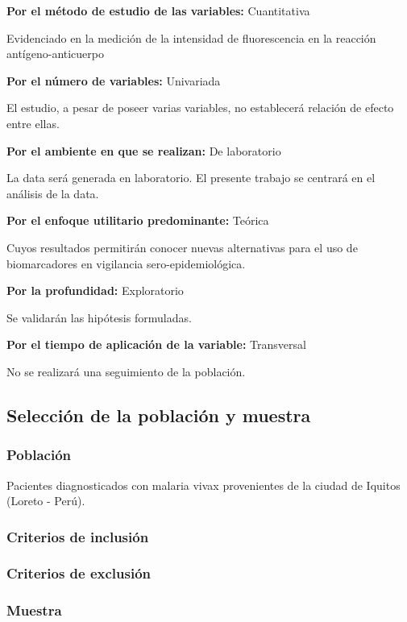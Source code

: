 \documentclass[]{article}
\begin{document}
\textbf{Por el método de estudio de las variables:} Cuantitativa

Evidenciado en la medición de la intensidad de fluorescencia en la
reacción antígeno-anticuerpo

\textbf{Por el número de variables:} Univariada

El estudio, a pesar de poseer varias variables, no establecerá relación
de efecto entre ellas.

\textbf{Por el ambiente en que se realizan:} De laboratorio

La data será generada en laboratorio. El presente trabajo se centrará en
el análisis de la data.

\textbf{Por el enfoque utilitario predominante:} Teórica

Cuyos resultados permitirán conocer nuevas alternativas para el uso de
biomarcadores en vigilancia sero-epidemiológica.

\textbf{Por la profundidad:} Exploratorio

Se validarán las hipótesis formuladas.

\textbf{Por el tiempo de aplicación de la variable:} Transversal

No se realizará una seguimiento de la población.

\subsection{Selección de la población y
muestra}\label{seleccion-de-la-poblacion-y-muestra}

\subsubsection{Población}\label{poblacion}

Pacientes diagnosticados con malaria vivax provenientes de la ciudad de
Iquitos (Loreto - Perú).

\subsubsection{Criterios de inclusión}\label{criterios-de-inclusion}

\subsubsection{Criterios de exclusión}\label{criterios-de-exclusion}

\subsubsection{Muestra}\label{muestra}
\end{document}
